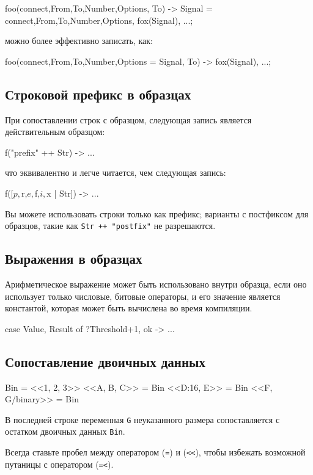 \begin{erlang}
foo({connect,From,To,Number,Options}, To) ->
    Signal = {connect,From,To,Number,Options},
    fox(Signal),
    ...;
\end{erlang}

можно более эффективно записать, как:

\begin{erlang}
foo({connect,From,To,Number,Options} = Signal, To) ->
    fox(Signal),
    ...;
\end{erlang}


\subsection{Строковой префикс в образцах}

При сопоставлении строк с образцом, следующая запись является действительным 
образцом:

\begin{erlang}
f("prefix" ++ Str) -> ...
\end{erlang}

что эквивалентно и легче читается, чем следующая запись:

\begin{erlang}
f([$p,$r,$e,$f,$i,$x | Str]) -> ...
\end{erlang}

Вы можете использовать строки только как префикс; варианты с постфиксом для 
образцов, такие как \texttt{Str ++ "postfix"} не разрешаются. 


\subsection{Выражения в образцах}

Арифметическое выражение может быть использовано внутри образца, если оно 
использует только числовые, битовые операторы, и его значение является 
константой, которая может быть вычислена во время компиляции.

\begin{erlang}
case {Value, Result} of
    {?Threshold+1, ok} -> ...   %
\end{erlang}


\subsection{Сопоставление двоичных данных}

\begin{erlang}
Bin = <<1, 2, 3>>      %
<<A, B, C>> = Bin      %
<<D:16, E>> = Bin      %
<<F, G/binary>> = Bin  %
\end{erlang}

В последней строке переменная \texttt{G} неуказанного размера сопоставляется с 
остатком двоичных данных \texttt{Bin}.

Всегда ставьте пробел между оператором (\texttt{=}) и (\verb|<<|), чтобы 
избежать возможной путаницы с оператором (\texttt{=<}).

